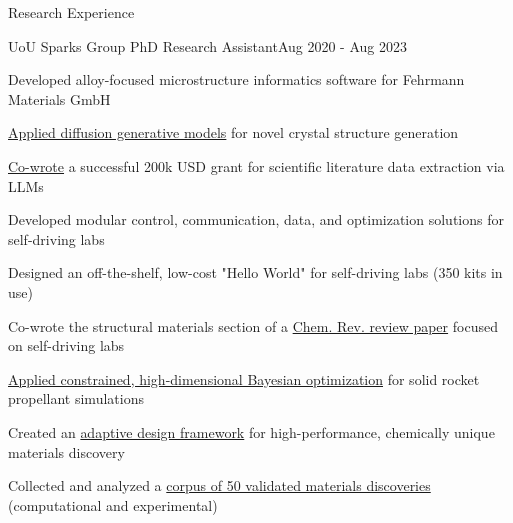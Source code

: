 \documentclass{resume} %
\begin{document}
\begin{rSection}{Research Experience}
\begin{rSubsection}{UoU Sparks Group PhD Research Assistant}{Aug 2020 - Aug 2023}{} \\
\item Developed alloy-focused microstructure informatics software for Fehrmann Materials GmbH
\item \href{https://doi.org/10.21105/joss.04528}{Applied diffusion generative models} for novel crystal structure generation
\item \href{https://www.nsf.gov/awardsearch/showAward?AWD_ID=2334411&HistoricalAwards=false}{Co-wrote} a successful 200k USD grant for scientific literature data extraction via LLMs
\item Developed modular control, communication, data, and optimization solutions for self-driving labs
\item Designed an off-the-shelf, low-cost "Hello World" for self-driving labs (350 kits in use)
\item Co-wrote the structural materials section of a \href{10.1021/acs.chemrev.4c00055}{Chem. Rev. review paper} focused on self-driving labs
\item \href{https://doi.org/10.1016/j.commatsci.2023.112134}{Applied constrained, high-dimensional Bayesian optimization} for solid rocket propellant simulations
\item Created an \href{https://doi.org/10.1039/D1DD00028D}{adaptive design framework} for high-performance, chemically unique materials discovery
\item Collected and analyzed a \href{https://doi.org/10.1016/B978-0-12-823144-9.00079-0}{corpus of 50 validated materials discoveries} (computational and experimental)
\end{rSubsection}


\end{rSection}
\end{document}
